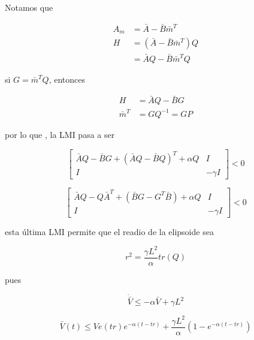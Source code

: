 \begin{flushright}
\end{flushright}

Notamos que 

\begin{equation*}
   \begin{aligned}
         A_m &= \bar{A}-\bar{B}\bar{m}^T\\
         H & = (\bar{A}-\bar{B}\bar{m}^T)Q\\
            &= \bar{A}Q-\bar{B}\bar{m}^T Q
   \end{aligned}
\end{equation*}

si $G=\bar{m}^T Q$, entonces 

\begin{equation*}
    \begin{aligned}
        H&=\bar{A}Q-\bar{B}G\\
        \bar{m}^T&=GQ^{-1} = GP
    \end{aligned}
\end{equation*}

por lo que , la LMI pasa a ser

\begin{equation*}
    \begin{bmatrix}
        \bar{A}Q-\bar{B}G+(\bar{A}Q-\bar{B}Q)^T+\alpha Q & I \\ I & -\gamma I
    \end{bmatrix} < 0
\end{equation*}

\begin{equation*}
    \begin{bmatrix}
        \bar{A}Q-Q\bar{A}^T+(\bar{B}G-G^T\bar{B})+\alpha Q & I \\ I & -\gamma I
    \end{bmatrix} < 0
\end{equation*}

esta última LMI permite que el readio de la elipsoide sea

\begin{equation*}
    r^2=\frac{\gamma L^2}{\alpha} tr(Q)
\end{equation*}

pues

\begin{equation*}
    \dot{\bar{V}}\leq-\alpha\bar{V}+\gamma L^2
\end{equation*}

\begin{equation*}
    \bar{V}(t)\leq Ve(tr)e^{-\alpha (t-tr)}+ \frac{\gamma L^2}{\alpha}(1-e^{-\alpha (t-tr)})
\end{equation*}


